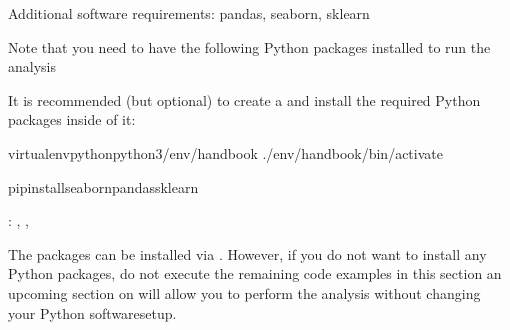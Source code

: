 \begin{importantnote}[before title={\thetcbcounter\ }, float, floatplacement=tb, check odd page=true]{Additional software requirements: pandas, seaborn, sklearn}

\sphinxAtStartPar
Note that you need to have the following Python packages installed to run the
analysis%
\begin{footnote}\sphinxAtStartFootnote
It is recommended (but optional) to create a
 and
install the required Python packages inside of it:

\sphinxSetupCodeBlockInFootnote
\begin{sphinxVerbatim}[commandchars=\\\{\}]
virtualenv\PYGZhy{}\PYGZhy{}pythonpython3\PYGZti{}/env/handbook
.\PYGZti{}/env/handbook/bin/activate
\end{sphinxVerbatim}

\sphinxSetupCodeBlockInFootnote
\begin{sphinxVerbatim}[commandchars=\\\{\}]
pipinstallseabornpandassklearn
\end{sphinxVerbatim}
%
\end{footnote}:
{},
%
{},
%
{}


\sphinxAtStartPar
The packages can be installed via {\hyperref[\detokenize{glossary:term-pip}]{}}.
However, if you do not want to install any
Python packages, do not execute the remaining code examples in this section
\textendash{} an upcoming section on  will allow you to
perform the analysis without changing your Python software\sphinxhyphen{}setup.


\end{importantnote}

